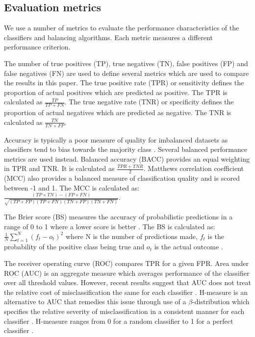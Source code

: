 \documentclass{sig-alternate-05-2015}
\begin{document}
	\subsection{Evaluation metrics}
	We use a number of metrics to evaluate the performance characteristics of the classifiers and balancing algorithms. Each metric measures a different performance criterion.
	
	The number of true positives (TP), true negatives (TN), false positives (FP) and false negatives (FN) are used to define several metrics which are used to compare the results in this paper. The true positive rate (TPR) or sensitivity defines the proportion of actual positives which are predicted as positive. The TPR is calculated as $\frac{TP}{TP + FN}$. The true negative rate (TNR) or specificity defines the proportion of actual negatives which are predicted as negative. The TNR is calculated as $\frac{TN}{TN + FP}$. 
	
	Accuracy is typically a poor measure of quality for imbalanced datasets as classifiers tend to bias towards the majority class \cite{Batista:2004:SBS:1007730.1007735, Chawla:2004:ESI:1007730.1007733}. Several balanced performance metrics are used instead. Balanced accuracy (BACC) provides an equal weighting in TPR and TNR. It is calculated as $\frac{TPR + TNR}{2}$. Matthews correlation coefficient (MCC) also provides a balanced measure of classification quality and is scored between -1 and 1. The MCC is calculated as: $\frac{(TP \times TN) - (FP \times FN)}{\sqrt{(TP + FP)(TP + FN)(TN + FP)(TN + FN)}}$. 
	
	The Brier score (BS) measures the accuracy of probabilistic predictions in a range of 0 to 1 where a lower score is better \cite{steyerberg2010assessing}. The BS is calculated as: $\frac{1}{N}\sum_{t=1}^{N}(f_t - o_t)^2$ where N is the number of predictions made, $f_t$ is the probability of the positive class being true and $o_t$ is the actual outcome \cite{steyerberg2010assessing}.
	
	The receiver operating curve (ROC) compares TPR for a given FPR. Area under ROC (AUC) is an aggregate measure which averages performance of the classifier over all threshold values. However, recent results suggest that AUC does not treat the relative cost of misclassification the same for each classifier \cite{Hand:2009:MCP:1612990.1613009}. H-measure is an alternative to AUC that remedies this issue through use of a $\beta$-distribution which specifies the relative severity of misclassification in a consistent manner for each classifier \cite{Hand:2009:MCP:1612990.1613009}. H-measure ranges from 0 for a random classifier to 1 for a perfect classifier \cite{Hand:2009:MCP:1612990.1613009}.
	
\end{document}
